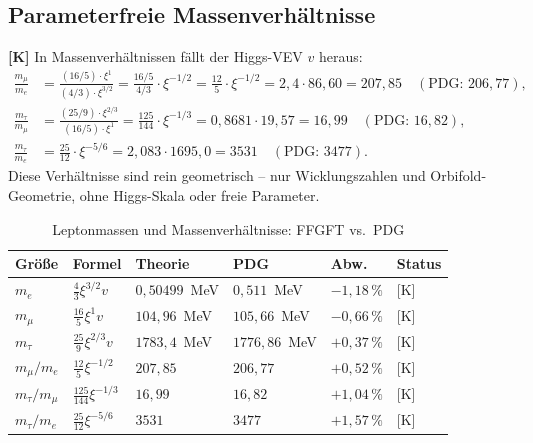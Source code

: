 \subsection{Parameterfreie Massenverhältnisse}

\textbf{[K]} In Massenverhältnissen fällt der Higgs-VEV $v$ heraus:
\begin{align}
  \frac{m_\mu}{m_e}
    &= \frac{(16/5)\cdot\xi^{1}}{(4/3)\cdot\xi^{3/2}}
     = \frac{16/5}{4/3} \cdot \xi^{-1/2}
     = \frac{12}{5} \cdot \xi^{-1/2}
     = 2{,}4 \cdot 86{,}60
     = 207{,}85
     \quad (\text{PDG: } 206{,}77), \\
  \frac{m_\tau}{m_\mu}
    &= \frac{(25/9)\cdot\xi^{2/3}}{(16/5)\cdot\xi^{1}}
     = \frac{125}{144} \cdot \xi^{-1/3}
     = 0{,}8681 \cdot 19{,}57
     = 16{,}99
     \quad (\text{PDG: } 16{,}82), \\
  \frac{m_\tau}{m_e}
    &= \frac{25}{12} \cdot \xi^{-5/6}
     = 2{,}083 \cdot 1695{,}0
     = 3531
     \quad (\text{PDG: } 3477).
\end{align}
Diese Verhältnisse sind rein geometrisch -- nur Wicklungszahlen und
Orbifold-Geometrie, ohne Higgs-Skala oder freie Parameter.

\begin{table}[h]
\centering
\caption{Leptonmassen und Massenverhältnisse: FFGFT vs.\ PDG}
\label{tab:leptonen_vgl}
\begin{tabular}{llllll}
\toprule
Größe & Formel & Theorie & PDG & Abw. & Status \\
\midrule
$m_e$           & $\frac{4}{3}\xi^{3/2}v$ & $0{,}50499$~MeV   & $0{,}511$~MeV   & $-1{,}18\,\%$ & [K] \\
$m_\mu$         & $\frac{16}{5}\xi^{1}v$  & $104{,}96$~MeV  & $105{,}66$~MeV  & $-0{,}66\,\%$ & [K] \\
$m_\tau$        & $\frac{25}{9}\xi^{2/3}v$ & $1783{,}4$~MeV & $1776{,}86$~MeV & $+0{,}37\,\%$ & [K] \\
\midrule
$m_\mu/m_e$     & $\frac{12}{5}\xi^{-1/2}$ & $207{,}85$ & $206{,}77$ & $+0{,}52\,\%$ & [K] \\
$m_\tau/m_\mu$  & $\frac{125}{144}\xi^{-1/3}$ & $16{,}99$ & $16{,}82$ & $+1{,}04\,\%$ & [K] \\
$m_\tau/m_e$    & $\frac{25}{12}\xi^{-5/6}$ & $3531$ & $3477$ & $+1{,}57\,\%$ & [K] \\
\bottomrule
\end{tabular}
\end{table}

